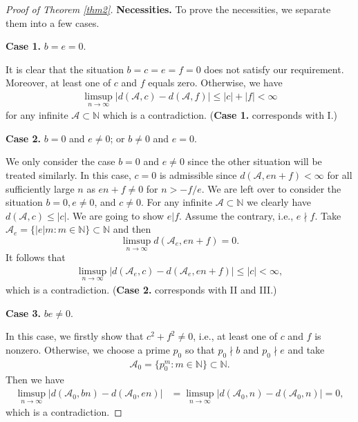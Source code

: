 \documentclass[12pt,a4paper,reqno]{amsart}
\numberwithin{equation}{section}
\theoremstyle{plain}
\theoremstyle{definition}
\begin{document}
\begin{proof}[Proof of Theorem \ref{thm2}]
{\bf Necessities.}
To prove the necessities, we separate them into a few cases.

{\bf Case 1.} $b=e=0$.

It is clear that the situation $b=c=e=f=0$ does not satisfy our requirement. Moreover, at least one of $c$ and $f$ equals zero. Otherwise, we have
\begin{align*}
\limsup_{n\rightarrow\infty}|d(\mathcal{A},c)-d(\mathcal{A},f)|\le |c|+|f|<\infty
\end{align*}
for any infinite $\mathcal{A}\subset \mathbb{N}$ which is a contradiction. ({\bf Case 1.} corresponds with I.)

{\bf Case 2.} $b=0$ and $e\neq 0$; or $b\neq 0$ and $e= 0$.

We only consider the case $b=0$ and $e\neq 0$ since the other situation will be treated similarly. In this case, $c=0$ is admissible since $d(\mathcal{A},en+f)<\infty$ for all sufficiently large $n$ as $en+f\neq 0$ for $n>-f/e$. We are left over to consider the situation $b=0,e\neq 0$, and $c\neq 0$. For any infinite $\mathcal{A}\subset \mathbb{N}$ we clearly have
$
d(\mathcal{A},c)\le |c|.
$
We are going to show $e|f$. Assume the contrary, i.e., $e\nmid f$. Take $\mathcal{A}_e=\{|e|m: m\in \mathbb{N}\}\subset \mathbb{N}$ and then
$$
\limsup_{n\rightarrow\infty}d(\mathcal{A}_e,en+f)=0.
$$ 
It follows that
\begin{align*}
\limsup_{n\rightarrow\infty}|d(\mathcal{A}_e,c)-d(\mathcal{A}_e,en+f)|\le |c|<\infty,
\end{align*}
which is a contradiction. ({\bf Case 2.} corresponds with II and III.)

{\bf Case 3.} $be \neq 0$.

In this case, we firstly show that $c^2+f^2\neq 0$, i.e., at least one of $c$ and $f$ is nonzero. Otherwise, we choose a prime $p_0$ so that $p_0\nmid b$ and $p_0\nmid e$ and take 
\begin{align}\label{newadded1}
\mathcal{A}_0=\{p_0^m: m\in \mathbb{N}\}\subset \mathbb{N}.
\end{align} 
Then we have
\begin{align*}
\limsup_{n\rightarrow\infty}|d(\mathcal{A}_0,bn)-d(\mathcal{A}_0,en)|&=\limsup_{n\rightarrow\infty}|d(\mathcal{A}_0,n)-d(\mathcal{A}_0,n)|=0,
\end{align*} 
which is a contradiction. 


\end{proof}
\end{document}
